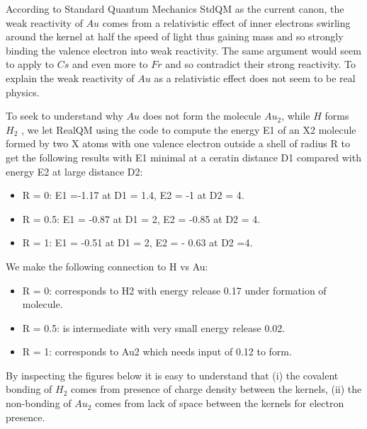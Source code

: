 \documentclass[11pt]{article} %
\begin{document}
According to Standard Quantum Mechanics StdQM as the current canon,  the weak reactivity of $Au$ comes from a relativistic effect of inner electrons swirling around the kernel at half the speed of light thus gaining mass and so strongly binding the valence electron into weak reactivity.  The same argument would seem to apply to $Cs$ and even more to $Fr$ and so contradict their strong reactivity.  To explain the weak reactivity of $Au$ as a relativistic effect does not seem to be real physics.


To seek to understand why $Au$ does not form the molecule $Au_2$,  while $H$ forms $H_2$ \cite{Covalent},  we let RealQM using the code \cite{Au2code} to compute the energy E1 of an X2 molecule formed by two X atoms with one valence electron outside a shell of radius R to get the following results with E1 minimal at a ceratin distance D1 compared with energy E2 at large distance D2:

\begin{itemize}
\item R = 0:    E1 =-1.17  at   D1 = 1.4,       E2 = -1     at  D2 = 4.
\item R = 0.5: E1 = -0.87  at D1 = 2,         E2 = -0.85 at D2 = 4.
\item R = 1:     E1 = -0.51  at D1 = 2,          E2 = - 0.63 at D2 =4.
\end{itemize}
We make the following connection to H vs Au:
\begin{itemize}
\item R = 0:  corresponds to H2 with energy release 0.17 under formation of molecule.
\item R = 0.5:  is intermediate with very small energy release 0.02.
\item R = 1:  corresponds to Au2 which needs input of 0.12 to form.
\end{itemize} 
By inspecting the figures below it is easy to understand that (i) the covalent bonding of $H_2$ comes from presence of charge density between the kernels, (ii) the non-bonding of $Au_2$ comes from lack of space between the kernels for electron presence.
\end{document}
